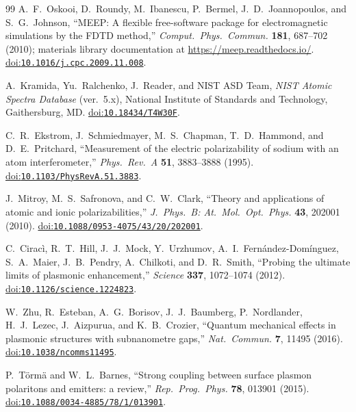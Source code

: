 \documentclass[11pt,a4paper]{article}
\newcommand{\doiref}[1]{\href{https://doi.org/#1}{doi:\nolinkurl{#1}}}
\begin{document}
\begin{thebibliography}{99}
A.~F.~Oskooi, D.~Roundy, M.~Ibanescu, P.~Bermel, J.~D.~Joannopoulos, and
S.~G.~Johnson,
``{MEEP}: A flexible free-software package for electromagnetic simulations by
the {FDTD} method,''
\emph{Comput.\ Phys.\ Commun.} \textbf{181}, 687--702 (2010);
materials library documentation at \url{https://meep.readthedocs.io/}.
\doiref{10.1016/j.cpc.2009.11.008}.

A.~Kramida, Yu.~Ralchenko, J.~Reader, and {NIST ASD Team},
\emph{{NIST} Atomic Spectra Database} (ver.\ 5.x),
National Institute of Standards and Technology, Gaithersburg, MD.
\doiref{10.18434/T4W30F}.

C.~R.~Ekstrom, J.~Schmiedmayer, M.~S.~Chapman, T.~D.~Hammond, and D.~E.~Pritchard,
``Measurement of the electric polarizability of sodium with an atom interferometer,''
\emph{Phys.\ Rev.\ A} \textbf{51}, 3883--3888 (1995).
\doiref{10.1103/PhysRevA.51.3883}.

J.~Mitroy, M.~S.~Safronova, and C.~W.~Clark,
``Theory and applications of atomic and ionic polarizabilities,''
\emph{J.\ Phys.\ B: At.\ Mol.\ Opt.\ Phys.} \textbf{43}, 202001 (2010).
\doiref{10.1088/0953-4075/43/20/202001}.

C.~Cirac\`{i}, R.~T.~Hill, J.~J.~Mock, Y.~Urzhumov, A.~I.~Fern\'{a}ndez-Dom\'{i}nguez,
S.~A.~Maier, J.~B.~Pendry, A.~Chilkoti, and D.~R.~Smith,
``Probing the ultimate limits of plasmonic enhancement,''
\emph{Science} \textbf{337}, 1072--1074 (2012).
\doiref{10.1126/science.1224823}.

W.~Zhu, R.~Esteban, A.~G.~Borisov, J.~J.~Baumberg, P.~Nordlander, H.~J.~Lezec,
J.~Aizpurua, and K.~B.~Crozier,
``Quantum mechanical effects in plasmonic structures with subnanometre gaps,''
\emph{Nat.\ Commun.} \textbf{7}, 11495 (2016).
\doiref{10.1038/ncomms11495}.

P.~T\"{o}rm\"{a} and W.~L.~Barnes,
``Strong coupling between surface plasmon polaritons and emitters: a review,''
\emph{Rep.\ Prog.\ Phys.} \textbf{78}, 013901 (2015).
\doiref{10.1088/0034-4885/78/1/013901}.

\end{thebibliography}
\end{document}
